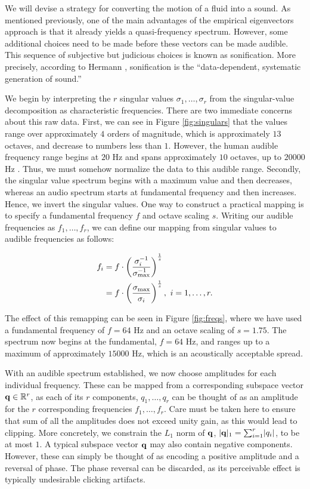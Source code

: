 \documentclass[11pt]{article}
\begin{document}
We will devise a strategy for converting the motion of a fluid into a sound. As mentioned previously, one of the main advantages of the empirical eigenvectors approach is that it already yields a quasi-frequency spectrum. However, some additional choices need to be made before these vectors can be made audible. This sequence of subjective but judicious choices is known as sonification. More precisely, according to Hermann \cite{hermann2008}, sonification is the ``data-dependent, systematic generation of sound.''

We begin by interpreting the $r$ singular values $\sigma_1, \ldots, \sigma_r$ from the singular-value decomposition as characteristic frequencies. There are two immediate concerns about this raw data. First, we can see in Figure \ref{fig:singulars} that the values range over approximately $4$ orders of magnitude, which is approximately $13$ octaves, and decrease to numbers less than $1$. However, the human audible frequency range begins at $20$ Hz and spans approximately $10$ octaves, up to $20000$ Hz \cite{rosen2011signals}. Thus, we must somehow normalize the data to this audible range. Secondly, the singular value spectrum begins with a maximum value and then decreases, whereas an audio spectrum starts at fundamental frequency and then increases. Hence, we invert the singular values. One way to construct a practical mapping is to specify a fundamental frequency $f$ and octave scaling $s$. Writing our audible frequencies as $f_1, \ldots, f_r$, we can define our mapping from singular values to audible frequencies as follows:

\begin{equation} 
\begin{aligned}
f_i &= f \cdot \left(\frac{\sigma_{i}^{-1}}{\sigma_{\textnormal{max}}^{-1}}\right)^{\frac{1}{s}} \\
&= f \cdot \left(\frac{\sigma_{\textnormal{max}}}{\sigma_i}\right)^{\frac{1}{s}}, \ i = 1, \ldots, r.
\end{aligned}
\end{equation}

The effect of this remapping can be seen in Figure \ref{fig:freqs}, where we have used a fundamental frequency of $f = 64$ Hz and an octave scaling of $s = 1.75$. The spectrum now begins at the fundamental, $f = 64$ Hz, and ranges up to a maximum of approximately $15000$ Hz, which is an acoustically acceptable spread.

With an audible spectrum established, we now choose amplitudes for each individual frequency. These can be mapped from a corresponding subspace vector $\mathbf{q} \in \mathbb{R}^r$, as each of its $r$ components, $q_1, \ldots, q_r$ can be thought of as an amplitude for the $r$ corresponding frequencies $f_1, \ldots, f_r$. Care must be taken here to ensure that sum of all the amplitudes does not exceed unity gain, as this would lead to clipping. More concretely, we constrain the $L_1$ norm of $\mathbf{q}$, $\lvert\mathbf{q}\rvert_1 = \sum_{i=1}^{r}\lvert q_i \rvert$, to be at most $1$. A typical subspace vector $\mathbf{q}$ may also contain negative components. However, these can simply be thought of as encoding a positive amplitude and a reversal of phase. The phase reversal can be discarded, as its perceivable effect is typically undesirable clicking artifacts.
\end{document}
